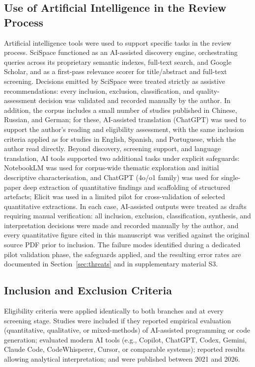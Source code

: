 \subsection{Use of Artificial Intelligence in the Review Process}
\label{sec:ai-use}
Artificial intelligence tools were used to support specific tasks in the review process. SciSpace functioned as an AI-assisted discovery engine, orchestrating queries across its proprietary semantic indexes, full-text search, and Google Scholar, and as a first-pass relevance scorer for title/abstract and full-text screening. Decisions emitted by SciSpace were treated strictly as assistive recommendations: every inclusion, exclusion, classification, and quality-assessment decision was validated and recorded manually by the author. In addition, the corpus includes a small number of studies published in Chinese, Russian, and German; for these, AI-assisted translation (ChatGPT) was used to support the author's reading and eligibility assessment, with the same inclusion criteria applied as for studies in English, Spanish, and Portuguese, which the author read directly. Beyond discovery, screening support, and language translation, AI tools supported two additional tasks under explicit safeguards: NotebookLM was used for corpus-wide thematic exploration and initial descriptive characterisation, and ChatGPT (4o/o1 family) was used for single-paper deep extraction of quantitative findings and scaffolding of structured artefacts; Elicit was used in a limited pilot for cross-validation of selected quantitative extractions. In each case, AI-assisted outputs were treated as drafts requiring manual verification: all inclusion, exclusion, classification, synthesis, and interpretation decisions were made and recorded manually by the author, and every quantitative figure cited in this manuscript was verified against the original source PDF prior to inclusion. The failure modes identified during a dedicated pilot validation phase, the safeguards applied, and the resulting error rates are documented in Section~\ref{sec:threats} and in supplementary material S3.

\subsection{Inclusion and Exclusion Criteria}
\label{sec:inclusion-exclusion}
Eligibility criteria were applied identically to both branches and at every screening stage. Studies were included if they reported empirical evaluation (quantitative, qualitative, or mixed-methods) of AI-assisted programming or code generation; evaluated modern AI tools (e.g., Copilot, ChatGPT, Codex, Gemini, Claude Code, CodeWhisperer, Cursor, or comparable systems); reported results allowing analytical interpretation; and were published between 2021 and 2026.
 

